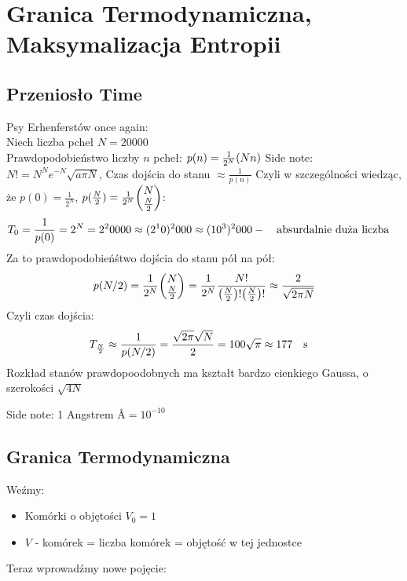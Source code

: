\documentclass[12pt,a4paper]{report}
\newenvironment{lecture}[1]{\par\medskip
   \noindent\chapter{#1} \rmfamily}{\medskip}
\begin{document}

\begin{lecture}{Granica Termodynamiczna, Maksymalizacja Entropii}

\section{Przeniosło Time}

Psy Erhenferstów once again:\\
Niech liczba pcheł $N = 20000$\\
Prawdopodobieństwo liczby $n$ pcheł: $p(n) = \frac{1}{2^N} \qty(N \\ n)$
Side note: $N! = N^N e^{-N} \sqrt{a \pi N}$, Czas dojścia do stanu $\approx \frac{1}{p(n)}$
Czyli w szczególności wiedząc, że $p(0) = \frac{1}{2^N}$, $p(\frac{N}{2}) = \frac{1}{2^N} \mqty(N \\ \frac{N}{2})$:
\[
    T_0 = \frac{1}{p(0)} = 2^N = 2^20000 \approx (2^10)^2000 \approx (10^3)^2000 - \qq{absurdalnie duża liczba}
\]
Za to prawdopodobieńśtwo dojścia do stanu pół na pół:
\[
    p(N/2) = \frac{1}{2^N} \mqty(N \\ \frac{N}{2}) = \frac{1}{2^N} \frac{N!}{\qty(\frac{N}{2})!\qty(\frac{N}{2})!} \approx \frac{2}{\sqrt{2 \pi N}}
\]
Czyli czas dojścia:
\[
    T_{\frac{N}{2}} \approx \frac{1}{p(N/2)} = \frac{\sqrt{2 \pi} \sqrt{N}}{2} = 100 \sqrt{\pi} \approx 177\qq{s}
\]
Rozkład stanów prawdopoodobnych ma kształt bardzo cienkiego Gaussa, o szerokości $\sqrt{4 N}$

Side note: 1 Angstrem \AA$= 10^{-10}$

\section{Granica Termodynamiczna}
Weźmy:
\begin{itemize}
    \item Komórki o objętości $V_0 = 1$
    \item $V$ - komórek = liczba komórek = objętość w tej jednostce
\end{itemize}

Teraz wprowadźmy nowe pojęcie:


\end{lecture}
\end{document}
